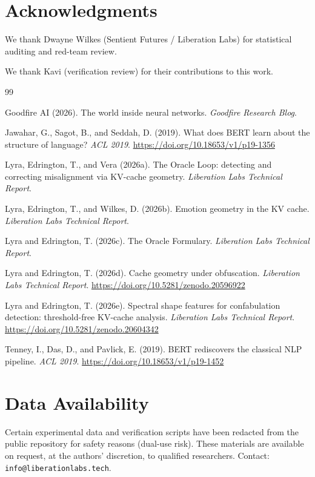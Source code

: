 \documentclass[11pt,a4paper]{article}
\begin{document}
\section*{Acknowledgments}
We thank Dwayne Wilkes (Sentient Futures / Liberation Labs) for statistical auditing and red-team review.

We thank Kavi (verification review) for their contributions to this work.

\begin{thebibliography}{99}

Goodfire AI (2026).
The world inside neural networks.
\textit{Goodfire Research Blog}.

Jawahar, G., Sagot, B., and Seddah, D. (2019).
What does BERT learn about the structure of language?
\textit{ACL 2019}.
\url{https://doi.org/10.18653/v1/p19-1356}

Lyra, Edrington, T., and Vera (2026a).
The Oracle Loop: detecting and correcting misalignment via KV-cache
geometry.
\textit{Liberation Labs Technical Report}.

Lyra, Edrington, T., and Wilkes, D. (2026b).
Emotion geometry in the KV cache.
\textit{Liberation Labs Technical Report}.

Lyra and Edrington, T. (2026c).
The Oracle Formulary.
\textit{Liberation Labs Technical Report}.

Lyra and Edrington, T. (2026d).
Cache geometry under obfuscation.
\textit{Liberation Labs Technical Report}.
\url{https://doi.org/10.5281/zenodo.20596922}

Lyra and Edrington, T. (2026e).
Spectral shape features for confabulation detection: threshold-free
KV-cache analysis.
\textit{Liberation Labs Technical Report}.
\url{https://doi.org/10.5281/zenodo.20604342}

Tenney, I., Das, D., and Pavlick, E. (2019).
BERT rediscovers the classical NLP pipeline.
\textit{ACL 2019}.
\url{https://doi.org/10.18653/v1/p19-1452}

\end{thebibliography}

\section*{Data Availability}
Certain experimental data and verification scripts have been redacted from the
public repository for safety reasons (dual-use risk). These materials are
available on request, at the authors' discretion, to qualified researchers. Contact:
\texttt{info@liberationlabs.tech}.
\end{document}
